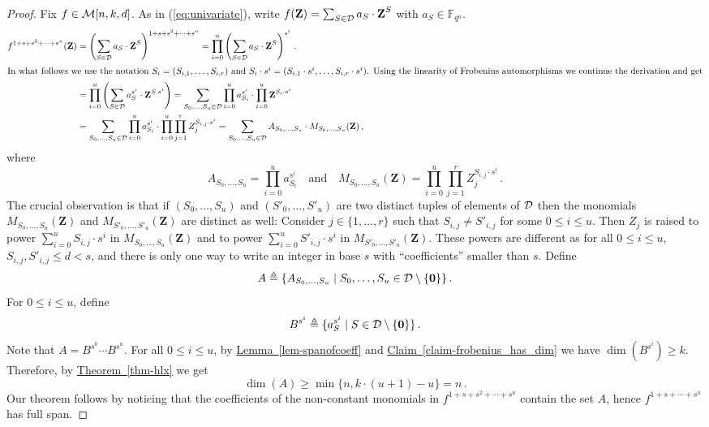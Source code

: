 \documentclass[10pt]{article}
\theoremstyle{definition}
\numberwithin{equation}{section}
\newcommand{\expref}[2]{\texorpdfstring{\hyperref[#2]{#1~\ref{#2}}}{#1~\ref{#2}}}
\newcommand{\Fn}{\mathbb F_{q^n}}
\newcommand{\M}[3]{{\cal M}[#1,#2,#3]}
\newcommand{\D}{{\cal D}}
\newcommand{\zero}{\{\textbf{0}\}}
\newcommand{\zi}{\textbf{Z}}
\begin{document}
\begin{proof}
Fix $f\in \M{n}{k}{d}$.
As in (\ref{eq:univariate}), write $f(\zi)=\sum_{S\in \D} a_S
\cdot\zi^S$ with $a_S\in \Fn$.
\begin{align*}
f^{1+s+s^2+\cdots +s^u}(\zi) &=
\left(\sum_{S\in \D} a_S \cdot \zi^S\right)^{1+s+s^2+\cdots +s^u}=
\prod_{i=0}^u \left(\sum_{S\in \D} a_S \cdot \zi^S\right)^{s^i}\,.\\
\intertext{In what follows we use the notation $S_i=(S_{i,1},\ldots,S_{i,r})$ and $S_i\cdot s^i=(S_{i,1}\cdot s^i,\ldots,S_{i,r}\cdot s^i)$. Using the linearity of Frobenius automorphisms we continue the derivation and get}
%
%
&= \prod_{i=0}^u \left(\sum_{S\in \D} a_S^{s^i} \cdot \zi^{S\cdot s^i}\right)
=\sum_{S_0,\ldots,S_u \in \D} \prod_{i=0}^u a_{S_i}^{s^i}\cdot\prod_{i=0}^u \zi^{S_i\cdot s^i}\\
&=\sum_{S_0,\ldots,S_u \in \D} \prod_{i=0}^u a_{S_i}^{s^i}\cdot
 \prod_{i=0}^u \prod_{j=1}^r Z_j^{S_{i,j}\cdot s^i} =
 \sum_{S_0,\ldots,S_u \in \D} A_{S_0,\ldots,S_u} \cdot M_{S_0,\ldots,S_u}(\zi)\,,\end{align*}
where 
\[
A_{S_0,\ldots,S_u}=\prod_{i=0}^u a_{S_i}^{s^i}\quad\text{and}\quad
M_{S_0,\ldots,S_u}(\zi)=\prod_{i=0}^u \prod_{j=1}^r Z_j^{S_{i,j}\cdot
  s^i}\,.
\]
The crucial observation is that if $(S_0,\ldots, S_u)$ and $(S'_0,\ldots, S'_u)$ are two distinct tuples of elements of $\D$ then the monomials $M_{S_0,\ldots, S_u}(\zi)$
and $M_{S'_0,\ldots, S'_u}(\zi)$ are distinct as well:
Consider $j\in\{1,\ldots,r\}$ such that $S_{i,j}\neq S'_{i,j}$ for some $0\leq i \leq u$.
Then $Z_j$ is raised to power $\sum_{i=0}^u S_{i,j}\cdot s^i$ in $M_{S_0,\ldots, S_u}(\zi)$
and to power $\sum_{i=0}^u S'_{i,j}\cdot s^i$
in $M_{S'_0,\ldots, S'_u}(\zi)$.
These powers are different as for all $0\leq i \leq u$,
$S_{i,j},S'_{i,j}\leq d<s$, and there is only one way to write an integer in base $s$ with ``coefficients'' smaller than $s$.
Define    %
\[
A\triangleq \{A_{S_0,\ldots,S_u}\mid S_0,\ldots,S_u\in
\D\setminus\zero\}\,.
\]
 For $0\leq i \leq u$,
define    %
\[
B^{s^i}\triangleq \{a_S^{s^i}\mid  S\in \D\setminus \zero\}\,.
\]
Note that $A = B^{s^0}\cdots B^{s^u}$.
For all $0\leq i \leq u$, by \expref{Lemma}{lem-spanofcoeff} and \expref{Claim}{claim-frobenius_has_dim}
we have $\dim(B^{s^i})\geq k$.
Therefore, by \expref{Theorem}{thm-hlx} we get
\[\dim(A)\geq \min\{n, k\cdot (u+1) - u\}=n\,.\]
 Our theorem follows by noticing that the coefficients of the non-constant monomials in  $f^{1+s+s^2+\cdots +  s^u}$
 contain the set $A$, hence $f^{1+s+\cdots+s^u}$ has full span.
\end{proof}
\end{document}
